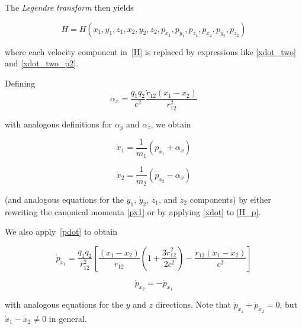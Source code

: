 \documentclass[12pt,a4paper]{article}
\theoremstyle{definition}
\theoremstyle{remark}
\begin{document}
The \textit{Legendre transform} then yields

\begin{equation}\label{H_p}
    H = H(x_1, y_1, z_1, x_2, y_2, z_2, p_{x_1}, p_{y_1}, p_{z_1}, p_{x_2}, p_{y_2}, p_{z_2})
\end{equation}

where each velocity component in~\eqref{H} is replaced by expressions like \eqref{xdot_two} and \eqref{xdot_two_p2}.

Defining
\begin{equation}\label{alpha_x}
    \alpha_x = \frac{q_1 q_2}{c^2} \frac{\dot{r}_{12} (x_1 - x_2)}{r_{12}^2}
\end{equation}

with analogous definitions for $\alpha_y$ and $\alpha_z$, we obtain

\begin{equation}\label{xdot_two}
    \dot{x}_1 = \frac{1}{m_1} \left(p_{x_1} + \alpha_x\right)
\end{equation}

\begin{equation}\label{xdot_two_p2}
    \dot{x}_2 = \frac{1}{m_2} \left(p_{x_2} - \alpha_x\right)
\end{equation}

(and analogous equations for the $\dot{y}_1$, $\dot{y}_2$, $\dot{z}_1$, and $\dot{z}_2$ components) by either rewriting the canonical momenta \eqref{px1} or by applying \eqref{xdot} to \eqref{H_p}.

We also apply~\eqref{pdot} to obtain

\begin{equation}\label{pdot_two}
    \dot{p}_{x_1} = \frac{q_1 q_2}{r_{12}^2}\left[\frac{(x_1 - x_2)}{r_{12}}\left(1 + \frac{3\dot{r}_{12}^2}{2 c^2}\right) - \frac{\dot{r}_{12}(\dot{x}_1 - \dot{x}_2)}{c^2}\right]
\end{equation}

\begin{equation}\label{pdot_two_p2}
    \dot{p}_{x_2} = -\dot{p}_{x_1}
\end{equation}

with analogous equations for the $y$ and $z$ directions. Note that $\dot{p}_{x_1} + \dot{p}_{x_2} = 0$, but $\dot{x}_1 - \dot{x}_2 \neq 0$ in general.
\end{document}
